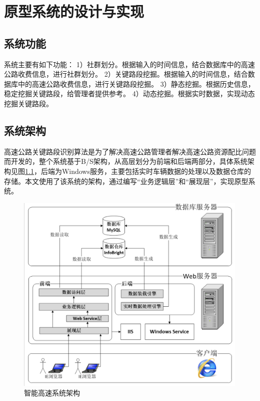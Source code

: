 
\chapter{原型系统的设计与实现}
	\section{系统功能}
		系统主要有如下功能：
		1）社群划分。根据输入的时间信息，结合数据库中的高速公路收费信息，进行社群划分。
		2）关键路段挖掘。根据输入的时间信息，结合数据库中的高速公路收费信息，进行关键路段挖掘。
		3）静态挖掘。根据历史信息，稳定挖掘关键路段，给管理者提供参考。
		4）动态挖掘。根据实时数据，实现动态挖掘关键路段。

	\section{系统架构}
		高速公路关键路段识别算法是为了解决高速公路管理者解决高速公路资源配比问题而开发的，整个系统基于B/S架构，从高层划分为前端和后端两部分，具体系统架构见图\ref{fig20}，后端为Windows服务，主要包括实时车辆数据的处理以及数据仓库的存储。本文使用了该系统的架构，通过编写“业务逻辑层”和“展现层”，实现原型系统。
		\begin{figure}[h]
		\centering
				\begin{minipage}{0.8\linewidth}
					\centering
					\includegraphics[width=4.4in]{picture/jiagou}
					\caption{智能高速系统架构}
					\label{fig20}
				\end{minipage}%
		\end{figure}

